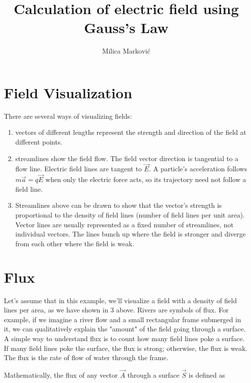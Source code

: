 \documentclass{ximera}
\title{Calculation of electric field using Gauss's Law}
\author{Milica Markovi\'c}
\begin{document}
  
\begin{abstract}  

\end{abstract}  
\maketitle    




\section{Field Visualization}

There are several ways of visualizing fields:
\begin{enumerate}
\item vectors of different lengths represent the strength and direction of the field at different points. 
\item streamlines show the field flow. The field vector direction is tangential to a flow line. Electric field lines are tangent to $\vec{E}$. A particle's acceleration follows $m\vec{a}=q\vec{E}$ when only the electric force acts, so its trajectory need not follow a field line.
\item Streamlines above can be drawn to show that the vector's strength is proportional to the density of field lines (number of field lines per unit area). Vector lines are usually represented as a fixed number of streamlines, not individual vectors. The lines bunch up where the field is stronger and diverge from each other where the field is weak.
\end{enumerate}

\section{Flux}

Let's assume that in this example, we'll visualize a field with a density of field lines per area, as we have shown in 3 above.  Rivers are symbols of flux. For example, if we imagine a river flow and a small rectangular frame submerged in it, we can qualitatively explain the "amount" of the field going through a surface.  A simple way to understand flux is to count how many field lines poke a surface.  If many field lines poke the surface, the flux is strong; otherwise, the flux is weak. The flux is the rate of flow of water through the frame.  


Mathematically, the flux of any vector $\vec{A}$ through a surface $\vec{S}$ is defined as
\end{document}
